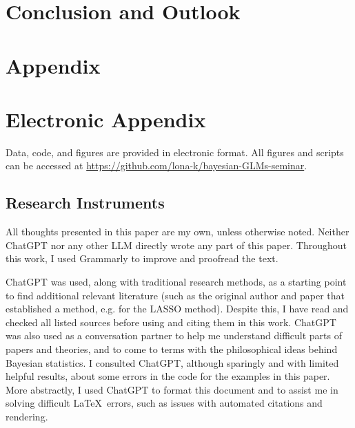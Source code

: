\documentclass[12pt]{article}
\begin{document}
\section{Conclusion and Outlook}
\label{sec:conclusion}


\newpage



\setcounter{page}{5} %

\appendix

\section{Appendix}
\label{sec:app}

\newpage

\section{Electronic Appendix}
\label{sec:el_app}

Data, code, and figures are provided in electronic format. All figures and scripts can be accessed at \url{https://github.com/lona-k/bayesian-GLMs-seminar}.

\newpage


\RaggedRight



\subsection*{Research Instruments}

All thoughts presented in this paper are my own, unless otherwise noted.
Neither ChatGPT nor any other LLM directly wrote any part of this paper.
Throughout this work, I used Grammarly \citep{grammarly} to improve and proofread the text.

ChatGPT \citep{chatgpt} was used, along with traditional research methods, as a starting point to find additional relevant literature (such as the original author and paper that established a method, e.g.\@ 
\citet{tibshirani_regression_1996} for the LASSO method). Despite this, I have read and checked all listed sources before using and citing them in this work.
ChatGPT was also used as a conversation partner to help me understand difficult parts of papers and theories, and to come to terms with the philosophical ideas behind Bayesian statistics. I consulted ChatGPT, although sparingly and with limited helpful results, about some errors in the code for the examples in this paper.
More abstractly, I used ChatGPT to format this document and to assist me in solving difficult \LaTeX \ errors, such as issues with automated citations and rendering.
\end{document}
